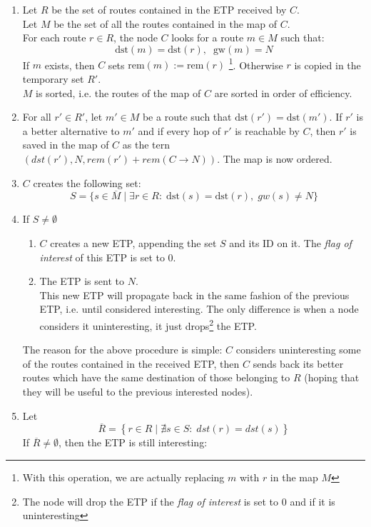 \documentclass[a4paper]{article}
\newcommand{\T}[1]{\textrm{#1}}
\newcommand{\pgra}[1]{\left\{#1\right\}}
\def\ove#1{{\overline{#1}}}
\def\0{{\emptyset}}
\begin{document}
\begin{description}
\begin{enumerate}
			received ETP, then $C$ immediately drops the ETP and
			skips all the following steps\footnote{This is the acyclic
			rule}.
		\item Let $R$ be the set of routes contained in the
			ETP received by $C$.\\
			Let $M$ be the set of all the routes contained in the map of $C$.\\
		For each route $r\in R$, the node $C$ looks for 
		a route $m\in M$ such that:
		\[\T{dst}(m)=\T{dst}(r),\;\;\T{gw}(m)=N
		\]
		If $m$ exists, then $C$ sets $\T{rem}(m):=\T{rem}(r)$
		\footnote{With this operation, we are actually replacing $m$
		with $r$ in the map $M$}.
		Otherwise $r$ is copied in the temporary set $R'$.\\
		$M$ is sorted, i.e. the routes of the map of $C$ are sorted in
		order of efficiency.
	\item For all $r' \in R'$,
		let $m'\in M$ be a route such that
		$\T{dst}(r')=\T{dst}(m')$. If
		$r'$ is a better alternative to $m'$ and if
		every hop of $r'$ is reachable by $C$,
		then $r'$  is saved in the map of $C$ as the
		tern $(dst(r'), N, rem(r')+rem(C\rightarrow
		N))$. The map is now ordered.
	\item $C$ creates the following set:
		\[
		S=\{s\in \ove M\;|\; \exists r\in R:\;\T{dst}(s)=\T{dst}(r),\;gw(s)\neq N\}
		\]
	\item \label{backpropstep}
		If $S\neq \0$
		\begin{enumerate}
			\item $C$ creates a new ETP, appending the set $S$ and its ID on it.
				The \emph{flag of interest} of this ETP is set to 0. 
			\item The ETP is sent to $N$.\\
				This new ETP will propagate back in the
				same fashion of the previous ETP, i.e.
				until considered interesting. The only difference is when a node
				considers it uninteresting, it just drops\footnote{The node will
				drop the ETP if the \emph{flag of interest} is set to 0 and if it is
				uninteresting} the ETP.
		\end{enumerate}
		The reason for the above procedure is simple: $C$ considers
		uninteresting some of the routes contained in the received
		ETP, then $C$ sends back its better routes which have the same destination of
		those belonging to $R$ (hoping that they will be useful to the
		previous interested nodes).
	\item 	Let \[\ove R=\pgra{r\in R\;|\;\nexists s\in S:\;dst(r)=dst(s)}\] 
		If $\ove R \neq \0$, then the ETP is still interesting: 

\end{enumerate}
\end{description}
\end{document}
